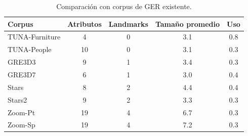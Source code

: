 \begin{table}[H]
\begin{center}
\footnotesize{

\begin{tabular} {  l c c c c}
\hline
Corpus											& Atributos			& Landmarks			& Tama\~{n}o promedio	& Uso \\
\hline
TUNA-Furniture							& 4								& 0							& 3.1				& 0.8   \\
TUNA-People									& 10							& 0							& 3.1				& 0.3   \\
GRE3D3											& 9								& 1							& 3.4				& 0.3   \\
GRE3D7											& 6								& 1							& 3.0				& 0.4   \\
Stars												& 8								& 2							& 4.4				& 0.4   \\
Stars2											& 9								& 2							& 3.3				& 0.3   \\
Zoom-Pt											& 19							& 4							& 6.7				& 0.3   \\
Zoom-Sp											& 19							& 4							& 7.2				& 0.3   \\
\hline
\end{tabular}
}
\end{center}
\caption{Comparaci\'on con corpus de GER existente.}
\label{tab-comparison}
\end{table}



%
%

